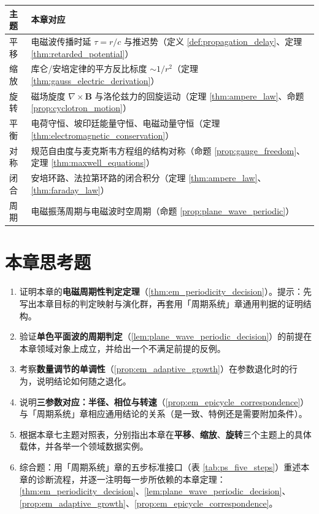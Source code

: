 \begin{center}
\begin{tabular}{>{\centering\arraybackslash}p{2.2cm}>{\centering\arraybackslash}p{9.5cm}}
\toprule
主题 & 本章对应 \\
\midrule
平移 & 电磁波传播时延 $\tau=r/c$ 与推迟势（定义 \ref{def:propagation_delay}、定理 \ref{thm:retarded_potential}） \\
缩放 & 库仑/安培定律的平方反比标度 $\sim 1/r^2$（定理 \ref{thm:gauss_electric_derivation}） \\
旋转 & 磁场旋度 $\nabla\times\mathbf{B}$ 与洛伦兹力的回旋运动（定理 \ref{thm:ampere_law}、命题 \ref{prop:cyclotron_motion}） \\
平衡 & 电荷守恒、坡印廷能量守恒、电磁动量守恒（定理 \ref{thm:electromagnetic_conservation}） \\
对称 & 规范自由度与麦克斯韦方程组的结构对称（命题 \ref{prop:gauge_freedom}、定理 \ref{thm:maxwell_equations}） \\
闭合 & 安培环路、法拉第环路的闭合积分（定理 \ref{thm:ampere_law}、\ref{thm:faraday_law}） \\
周期 & 电磁振荡周期与电磁波时空周期（命题 \ref{prop:plane_wave_periodic}） \\
\bottomrule
\end{tabular}
\end{center}

\section*{本章思考题}

\begin{enumerate}[leftmargin=3em, label=\textbf{题 \arabic*}]
    \item 证明本章的\textbf{电磁周期性判定定理}（\ref{thm:em_periodicity_decision}）。提示：先写出本章目标的判定映射与演化群，再套用「周期系统」章通用判据的证明结构。

    \item 验证\textbf{单色平面波的周期判定}（\ref{lem:plane_wave_periodic_decision}）的前提在本章领域对象上成立，并给出一个不满足前提的反例。

    \item 考察\textbf{数量调节的单调性}（\ref{prop:em_adaptive_growth}）在参数退化时的行为，说明结论如何随之退化。

    \item 说明\textbf{三参数对应：半径、相位与转速}（\ref{prop:em_epicycle_correspondence}）与「周期系统」章相应通用结论的关系（是一致、特例还是需要附加条件）。

    \item 根据本章七主题对照表，分别指出本章在\textbf{平移}、\textbf{缩放}、\textbf{旋转}三个主题上的具体载体，并各举一个领域数据实例。

    \item 综合题：用「周期系统」章的五步标准接口（表 \ref{tab:ps_five_steps}）重述本章的诊断流程，并逐一注明每一步所依赖的本章定理：\ref{thm:em_periodicity_decision}、\ref{lem:plane_wave_periodic_decision}、\ref{prop:em_adaptive_growth}、\ref{prop:em_epicycle_correspondence}。
\end{enumerate}


